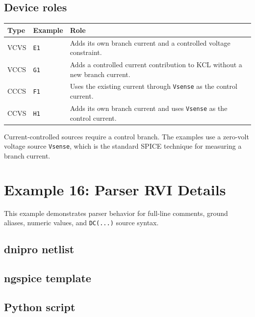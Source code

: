 \documentclass[11pt,a4paper]{article}
\newcommand{\code}[1]{\texttt{#1}}
\begin{document}


\subsection{Device roles}

\begin{longtable}{p{}p{}p{}}
\toprule
Type & Example & Role \\
\midrule
VCVS & \code{E1} & Adds its own branch current and a controlled voltage
constraint. \\
VCCS & \code{G1} & Adds a controlled current contribution to KCL without a new
branch current. \\
CCCS & \code{F1} & Uses the existing current through \code{Vsense} as the control
current. \\
CCVS & \code{H1} & Adds its own branch current and uses \code{Vsense} as the
control current. \\
\bottomrule
\end{longtable}

Current-controlled sources require a control branch. The examples use a
zero-volt voltage source \code{Vsense}, which is the standard SPICE technique
for measuring a branch current.

\section{Example 16: Parser RVI Details}
\label{sec:ex-parser-rvi}

This example demonstrates parser behavior for full-line comments, ground aliases,
numeric values, and \code{DC(...)} source syntax.

\subsection{dnipro netlist}



\subsection{ngspice template}



\subsection{Python script}
\end{document}
